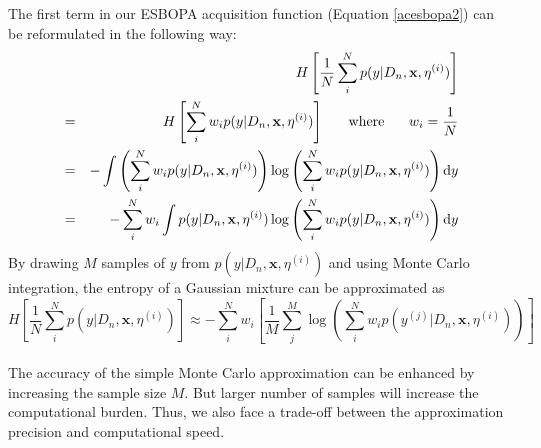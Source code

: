 \documentclass[a4paper,11pt]{report}
\begin{document}
The first term in our ESBOPA acquisition function (Equation \ref{acesbopa2}) can be reformulated in the following way:
	\begin{eqnarray*}
	& & H \left[ \frac{1}{N}  \sum_i^{N} p(y \vert D_n,\mathbf{x},\eta^{(i)}) \right] 
	\\ &=& H \left[  \sum_i^{N} w_i  p(y \vert D_n,\mathbf{x},\eta^{(i)}) \right]   \hspace{0.5 cm} \text{  where  } \hspace{0.5cm}  w_i=  \frac{1}{N}
	\\ &=& - \int \left(  \sum_i^{N} w_i  p(y \vert D_n,\mathbf{x},\eta^{(i)})  \right) \log \left( \sum_i^{N} w_i  p(y \vert D_n,\mathbf{x},\eta^{(i)}) \right) \mathrm{d}y
	\\ &=& -  \sum_i^{N} w_i  \int p(y \vert D_n,\mathbf{x},\eta^{(i)})  \log \left( \sum_i^{N} w_i  p(y \vert D_n,\mathbf{x},\eta^{(i)}) \right) \mathrm{d}y	
	\end{eqnarray*}
By drawing $M$ samples of $y$ from $ p(y \vert D_n,\mathbf{x},\eta^{(i)}) $ and using Monte Carlo integration, the entropy of a Gaussian mixture can be approximated as  
	\begin{equation}
	 H \left[ \frac{1}{N}  \sum_i^{N} p(y \vert D_n,\mathbf{x},\eta^{(i)}) \right] \approx  -  \sum_i^{N} w_i  \left[ \frac{1}{M} \sum_j^{M} \log \left( \sum_i^{N} w_i  p(y^{(j)} \vert D_n,\mathbf{x},\eta^{(i)}) \right) \right]			
	\end{equation}
\\ \noindent
The accuracy of the simple Monte Carlo approximation  can be enhanced by increasing the sample size $M$. But larger number of samples will increase the computational burden. Thus, we also face a trade-off between the approximation precision and computational speed. 
\end{document}
